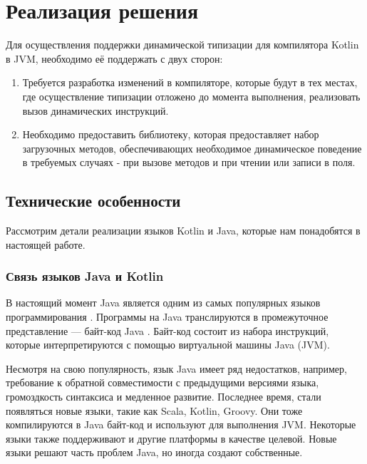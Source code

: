 \section{Реализация решения}

Для осуществления поддержки динамической типизации для компилятора Kotlin в JVM, необходимо её поддержать с двух сторон:

\begin{enumerate}
    \item Требуется разработка изменений в компиляторе, которые будут в тех местах, где осуществление типизации отложено до момента выполнения, реализовать вызов динамических инструкций.
    \item Необходимо предоставить библиотеку, которая предоставляет набор загрузочных методов, обеспечивающих необходимое динамическое поведение в требуемых случаях - при вызове методов и при чтении или записи в поля.
\end{enumerate}




\subsection{Технические особенности}

Рассмотрим детали реализации языков Kotlin и Java, которые нам понадобятся в настоящей работе.

\subsubsection{Связь языков Java и Kotlin}
\label{sec:connectKotlinWithJava}

В настоящий момент Java является одним из самых популярных языков программирования \cite{online:TIOBELanguageIndex}. Программы на Java транслируются в промежуточное представление --- байт-код Java \cite{book:yellin1996java}. Байт-код состоит из набора инструкций, которые интерпретируются с помощью виртуальной машины Java (JVM).

Несмотря на свою популярность, язык Java имеет ряд недостатков, например, требование к обратной совместимости с предыдущими версиями языка, громоздкость синтаксиса и медленное развитие. Последнее время, стали появляться новые языки, такие как Scala, Kotlin, Groovy. Они тоже компилируются в Java байт-код и используют для выполнения JVM. Некоторые языки также поддерживают и другие платформы в качестве целевой. Новые языки решают часть проблем Java, но иногда создают собственные.
    
